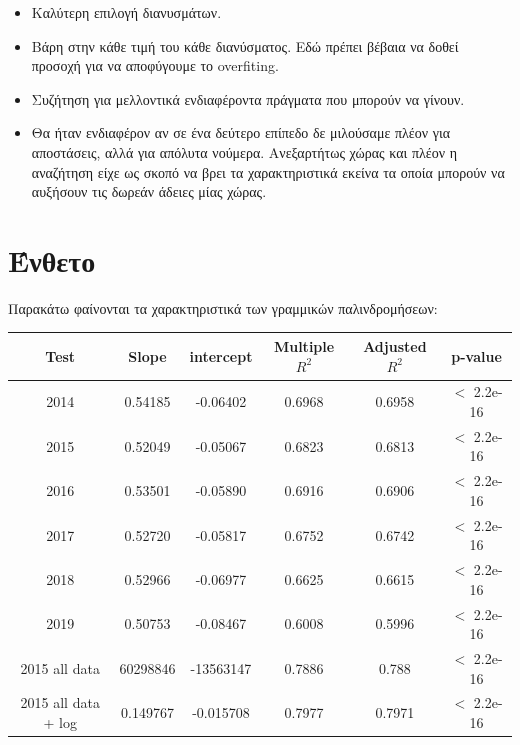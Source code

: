 \documentclass[a4paper,twoside,10pt]{article}
\begin{document}
	\begin{itemize}
		\item Καλύτερη επιλογή διανυσμάτων.
		\item Βάρη στην κάθε τιμή του κάθε διανύσματος. Εδώ πρέπει βέβαια να δοθεί προσοχή για να αποφύγουμε το overfiting. 
		\item Συζήτηση για μελλοντικά ενδιαφέροντα πράγματα που μπορούν να γίνουν.
		\item Θα ήταν ενδιαφέρον αν σε ένα δεύτερο επίπεδο δε μιλούσαμε πλέον για αποστάσεις, αλλά για απόλυτα νούμερα. Ανεξαρτήτως χώρας και πλέον η αναζήτηση είχε ως σκοπό να βρει τα χαρακτηριστικά εκείνα τα οποία μπορούν να αυξήσουν τις δωρεάν άδειες μίας χώρας.
	\end{itemize}
	\section{Ένθετο}
	Παρακάτω φαίνονται τα χαρακτηριστικά των γραμμικών παλινδρομήσεων:
	\begin{table}[ht]
		\centering
		\begin{tabular}{c|c|c|c|c|c }
			Test & Slope & intercept & Multiple $R^2$ & Adjusted $R^2$ & p-value\\
			\hline
			2014                     & 0.54185&-0.06402     & 0.6968   & 0.6958   &  $<$ 2.2e-16\\
			2015                     &0.52049&  -0.05067    & 0.6823   & 0.6813   &  $<$ 2.2e-16\\
			2016                       &0.53501    & -0.05890   & 0.6916   & 0.6906   &  $<$ 2.2e-16\\
			2017                       &0.52720& -0.05817   & 0.6752   &0.6742    &  $<$ 2.2e-16\\
			2018                       &0.52966& -0.06977   & 0.6625   & 0.6615    &  $<$ 2.2e-16\\
			2019                     &0.50753    & -0.08467     & 0.6008   & 0.5996   &  $<$ 2.2e-16\\
			2015 all data              &60298846&  -13563147      & 0.7886   & 0.788   &   $<$ 2.2e-16\\
			2015 all data + log        &0.149767   &-0.015708       & 0.7977   & 0.7971   &  $<$ 2.2e-16\\
			\hline
			
		\end{tabular}
	\end{table}
	
\end{document}
